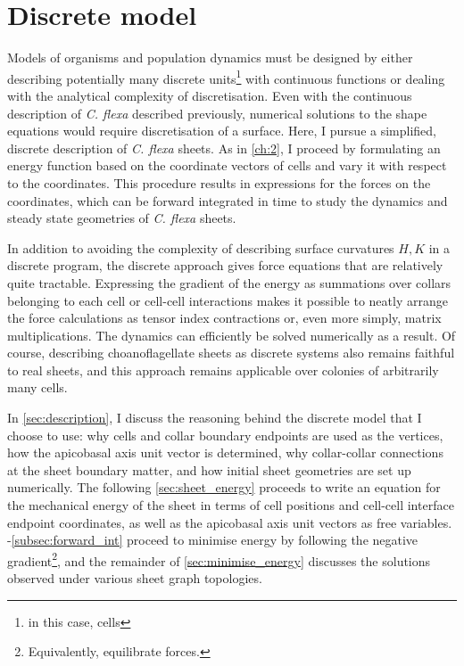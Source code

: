 \chapter{Discrete model} \label{ch:3}

\ifpdf
    \graphicspath{{Chapter3/Figs/Raster/}{Chapter3/Figs/PDF/}{Chapter3/Figs/}}
\else
    \graphicspath{{Chapter3/Figs/Vector/}{Chapter3/Figs/}}
\fi

Models of organisms and population dynamics must be designed by either describing potentially many discrete units\footnote{in this case, cells} with continuous functions or dealing with the analytical complexity of discretisation. 
Even with the continuous description of \textit{C. flexa} described previously, numerical solutions to the shape equations would require discretisation of a surface. 
Here, I pursue a simplified, discrete description of \textit{C. flexa} sheets. 
As in \cref{ch:2}, I proceed by formulating an energy function based on the coordinate vectors of cells and vary it with respect to the coordinates. 
This procedure results in expressions for the forces on the coordinates, which can be forward integrated in time to study the dynamics and steady state geometries of \textit{C. flexa} sheets.

In addition to avoiding the complexity of describing surface curvatures $H, K$ in a discrete program, the discrete approach gives force equations that are relatively quite tractable. 
Expressing the gradient of the energy as summations over collars belonging to each cell or cell-cell interactions makes it possible to neatly arrange the force calculations as tensor index contractions or, even more simply, matrix multiplications. 
The dynamics can efficiently be solved numerically as a result.
Of course, describing choanoflagellate sheets as discrete systems also remains faithful to real sheets, and this approach remains applicable over colonies of arbitrarily many cells.

In \cref{sec:description}, I discuss the reasoning behind the discrete model that I choose to use: why cells and collar boundary endpoints are used as the vertices, how the apicobasal axis unit vector is determined, why collar-collar connections at the sheet boundary matter, and how initial sheet geometries are set up numerically.
The following \cref{sec:sheet_energy} proceeds to write an equation for the mechanical energy of the sheet in terms of cell positions and cell-cell interface endpoint coordinates, as well as the apicobasal axis unit vectors as free variables.
-\ref{subsec:forward_int} proceed to minimise energy by following the negative gradient\footnote{Equivalently, equilibrate forces.}, and the remainder of \cref{sec:minimise_energy} discusses the solutions observed under various sheet graph topologies.


